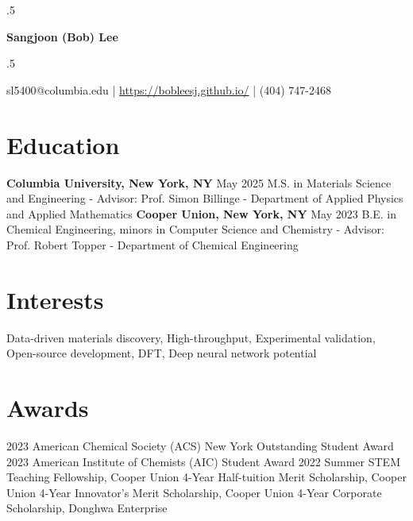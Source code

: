 \documentclass{article}%
\date{\today}%
\begin{document}
%
\normalsize%
\moveleft.5\hoffset\centerline{\large\bf Sangjoon (Bob) Lee}%
\moveleft.5\hoffset\centerline{\small sl5400@columbia.edu | \href{https://bobleesj.github.io/}{https://bobleesj.github.io/} | (404) 747-2468}%
\section*{Education}%
\label{sec:Education}%
\textbf{Columbia University, New York, NY}%
\hfill May 2025%
\newline%
M.S. in Materials Science and Engineering%
\newline%
{-} Advisor: Prof. Simon Billinge%
\newline%
{-} Department of Applied Physics and Applied Mathematics%
\newline%
\newline%
%
\textbf{Cooper Union, New York, NY}%
\hfill May 2023%
\newline%
B.E. in Chemical Engineering, minors in Computer Science and Chemistry%
\newline%
{-} Advisor: Prof. Robert Topper%
\newline%
{-} Department of Chemical Engineering

%
\section*{Interests}%
\label{sec:Interests}%
Data{-}driven materials discovery, High{-}throughput, Experimental validation, Open{-}source development, DFT, Deep neural network potential

%
\section*{Awards}%
\label{sec:Awards}%
2023 American Chemical Society (ACS) New York Outstanding Student Award\newline%
%
2023 American Institute of Chemists (AIC) Student Award\newline%
%
2022 Summer STEM Teaching Fellowship, Cooper Union\newline%
%
4{-}Year Half{-}tuition Merit Scholarship, Cooper Union\newline%
%
4{-}Year Innovator’s Merit Scholarship, Cooper Union\newline%
%
4{-}Year Corporate Scholarship, Donghwa Enterprise 

%
\end{document}
